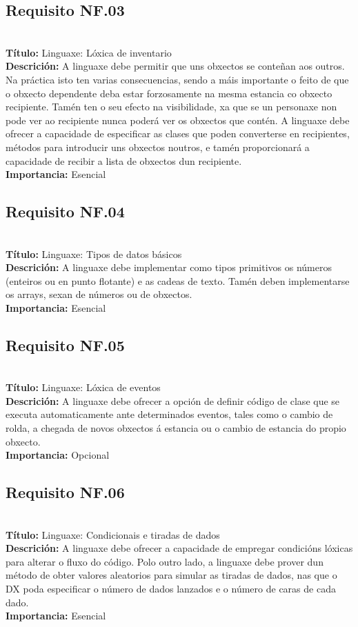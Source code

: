 \subsection{Requisito NF.03}~\\
{\bf Título:} Linguaxe: Lóxica de inventario\\
{\bf Descrición:} A linguaxe debe permitir que uns obxectos se conteñan aos outros. Na práctica isto ten varias consecuencias, sendo a máis importante o feito de que o obxecto dependente deba estar forzosamente na mesma estancia co obxecto recipiente. Tamén ten o seu efecto na visibilidade, xa que se un personaxe non pode ver ao recipiente nunca poderá ver os obxectos que contén. A linguaxe debe ofrecer a capacidade de especificar as clases que poden converterse en recipientes, métodos para introducir uns obxectos noutros, e tamén proporcionará a capacidade de recibir a lista de obxectos dun recipiente.\\
{\bf Importancia:} Esencial

\subsection{Requisito NF.04}~\\
{\bf Título:} Linguaxe: Tipos de datos básicos\\
{\bf Descrición:} A linguaxe debe implementar como tipos primitivos os números (enteiros ou en punto flotante) e as cadeas de texto. Tamén deben implementarse os arrays, sexan de números ou de obxectos.\\
{\bf Importancia:} Esencial

\subsection{Requisito NF.05}~\\
{\bf Título:} Linguaxe: Lóxica de eventos\\
{\bf Descrición:} A linguaxe debe ofrecer a opción de definir código de clase que se executa automaticamente ante determinados eventos, tales como o cambio de rolda, a chegada de novos obxectos á estancia ou o cambio de estancia do propio obxecto.\\
{\bf Importancia:} Opcional

\subsection{Requisito NF.06}~\\
{\bf Título:} Linguaxe: Condicionais e tiradas de dados\\
{\bf Descrición:} A linguaxe debe ofrecer a capacidade de empregar condicións lóxicas para alterar o fluxo do código. Polo outro lado, a linguaxe debe prover dun método de obter valores aleatorios para simular as tiradas de dados, nas que o DX poda especificar o número de dados lanzados e o número de caras de cada dado.\\
{\bf Importancia:} Esencial

